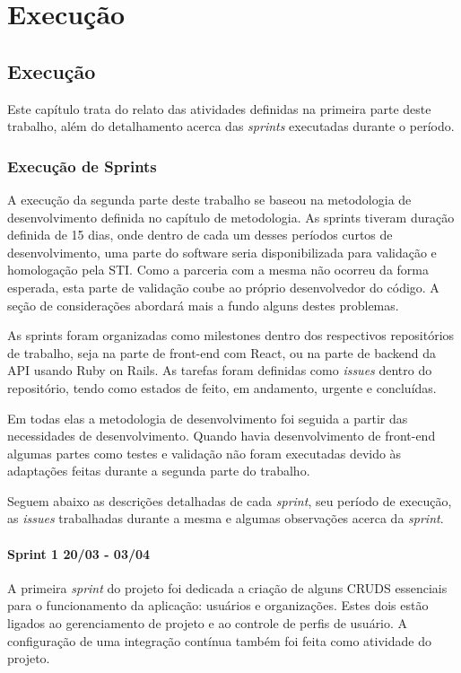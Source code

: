 \part{Execução}

\chapter[Execução]{Execução}

Este capítulo trata do relato das atividades definidas na primeira parte deste trabalho, além do detalhamento acerca das \textit{sprints} executadas durante o período.

\section{Execução de Sprints}

A execução da segunda parte deste trabalho se baseou na metodologia de desenvolvimento definida no capítulo de metodologia. As sprints tiveram duração definida de 15 dias, onde dentro de cada um desses períodos curtos de desenvolvimento, uma parte do software seria disponibilizada para validação e homologação pela STI. Como a parceria com a mesma não ocorreu da forma esperada, esta parte de validação coube ao próprio desenvolvedor do código. A seção de considerações abordará mais a fundo alguns destes problemas.

As sprints foram organizadas como milestones dentro dos respectivos repositórios de trabalho, seja na parte de front-end com React, ou na parte de backend da API usando Ruby on Rails. As tarefas foram definidas como \textit{issues} dentro do repositório, tendo como estados de feito, em andamento, urgente e concluídas.

Em todas elas a metodologia de desenvolvimento foi seguida a partir das necessidades de desenvolvimento. Quando havia desenvolvimento de front-end algumas partes como testes e validação não foram executadas devido às adaptações feitas durante a segunda parte do trabalho.

Seguem abaixo as descrições detalhadas de cada \textit{sprint}, seu período de execução, as \textit{issues} trabalhadas durante a mesma e algumas observações acerca da \textit{sprint}.

\subsection{Sprint 1 20/03 - 03/04}

A primeira \textit{sprint} do projeto foi dedicada a criação de alguns CRUDS essenciais para o funcionamento da aplicação: usuários e organizações. Estes dois estão ligados ao gerenciamento de projeto e ao controle de perfis de usuário. A configuração de uma integração contínua também foi feita como atividade do projeto.

